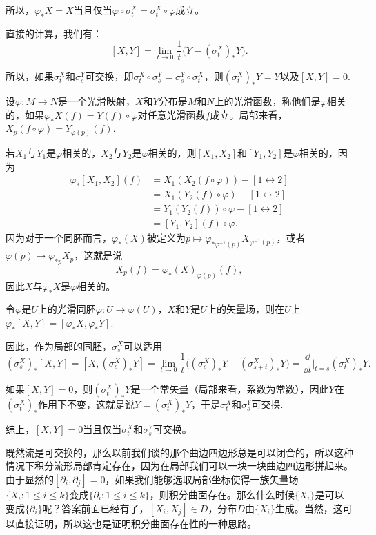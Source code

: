 \para 所以，$\varphi_*X=X$当且仅当$\varphi\circ \sigma^X_t=\sigma^X_t\circ \varphi$成立。

\para 直接的计算，我们有：
	\[
		[X,Y]=\lim_{t\to 0}\frac{1}{t}\bigl(Y-(\sigma_t^X)_*Y\bigr).
	\]

所以，如果$\sigma_t^X$和$\sigma_s^Y$可交换，即$\sigma_t^X\circ \sigma_s^Y=\sigma_s^Y\circ \sigma_t^X$，则$(\sigma_t^X)_*Y=Y$以及$[X,Y]=0$.

设$\varphi:M\to N$是一个光滑映射，$X$和$Y$分布是$M$和$N$上的光滑函数，称他们是$\varphi$相关的，如果$\varphi_*X(f)=Y(f)\circ \varphi$对任意光滑函数$f$成立。局部来看，$X_p(f\circ \varphi)=Y_{\varphi(p)}(f)$.

若$X_1$与$Y_1$是$\varphi$相关的，$X_2$与$Y_2$是$\varphi$相关的，则$[X_1,X_2]$和$[Y_1,Y_2]$是$\varphi$相关的，因为
\begin{align*}
	\varphi_*[X_1,X_2](f)&=X_1(X_2(f\circ \varphi))-[1\leftrightarrow 2]\\
	&=X_1(Y_2(f)\circ\varphi)-[1\leftrightarrow 2]\\
	&=Y_1(Y_2(f))\circ \varphi-[1\leftrightarrow 2]\\
	&=[Y_1,Y_2](f)\circ \varphi.
\end{align*}
因为对于一个同胚而言，$\varphi_*(X)$被定义为$p\mapsto \varphi_{*\varphi^{-1}(p)}X_{\varphi^{-1}(p)}$，或者$\varphi(p)\mapsto \varphi_{*p}X_p$，这就是说
\[
	X_p(f)=\varphi_*(X)_{\varphi(p)}(f),
\]
因此$X$与$\varphi_*X$是$\varphi$相关的。


\para 令$\varphi$是$U$上的光滑同胚$\varphi:U\to \varphi(U)$，$X$和$Y$是$U$上的矢量场，则在$U$上$\varphi_{*}[X,Y]=[\varphi_{*}X,\varphi_{*}Y]$.

因此，作为局部的同胚，$\sigma_s^X$可以适用
\[
	(\sigma_s^X)_*[X,Y]=[X,(\sigma_s^X)_*Y]=\lim_{t\to 0}\frac{1}{t}\bigl((\sigma_s^X)_*Y-(\sigma_{s+t}^X)_*Y\bigr)=\frac{\dd}{\dd t}\biggr|_{t=s}(\sigma_t^X)_*Y.
\]

如果$[X,Y]=0$，则$(\sigma_t^X)_*Y$是一个常矢量（局部来看，系数为常数），因此$Y$在$(\sigma_t^X)_*$作用下不变，这就是说$Y=(\sigma_t^X)_*Y$，于是$\sigma_t^X$和$\sigma_s^Y$可交换.

\para 综上，$[X,Y]=0$当且仅当$\sigma_t^X$和$\sigma_s^Y$可交换。

既然流是可交换的，那么以前我们谈的那个曲边四边形总是可以闭合的，所以这种情况下积分流形局部肯定存在，因为在局部我们可以一块一块曲边四边形拼起来。由于显然的$[\partial_i,\partial_j]=0$，如果我们能够选取局部坐标使得一族矢量场$\{X_i:1\leq i \leq k\}$变成$\{\partial_i:1\leq i \leq k\}$，则积分曲面存在。那么什么时候$\{X_i\}$是可以变成$\{\partial_i\}$呢？答案前面已经有了，$[X_i,X_j]\in D$，分布$D$由$\{X_i\}$生成。当然，这可以直接证明，所以这也是证明积分曲面存在性的一种思路。

